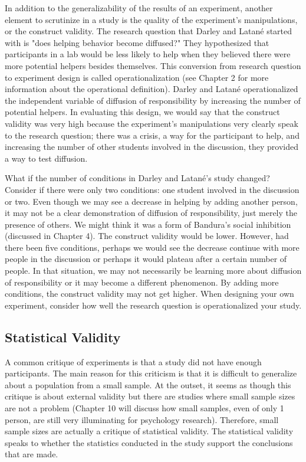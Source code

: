 In addition to the generalizability of the results of an experiment, another element to scrutinize in a study is the quality of the experiment's manipulations, or the construct validity. The research question that Darley and Latané started with is "does helping behavior become diffused?" They hypothesized that participants in a lab would be less likely to help when they believed there were more potential helpers besides themselves. This conversion from research question to experiment design is called operationalization (see Chapter 2 for more information about the operational definition). Darley and Latané operationalized the independent variable of diffusion of responsibility by increasing the number of potential helpers. In evaluating this design, we would say that the construct validity was very high because the experiment's manipulations very clearly speak to the research question; there was a crisis, a way for the participant to help, and increasing the number of other students involved in the discussion, they provided a way to test diffusion.
 

 

What if the number of conditions in Darley and Latané's study changed? Consider if there were only two conditions: one student involved in the discussion or two. Even though we may see a decrease in helping by adding another person, it may not be a clear demonstration of diffusion of responsibility, just merely the presence of others. We might think it was a form of Bandura's social inhibition (discussed in Chapter 4). The construct validity would
be lower. However, had there been five conditions, perhaps we would see the decrease continue with more people in the discussion or perhaps it would plateau after a certain number of people. In that situation, we may not necessarily be learning more about diffusion of responsibility or it may become a different phenomenon. By adding more conditions, the construct validity may not get higher. When designing your own experiment, consider how well the research question is operationalized your study.
 

 

\subsection{Statistical Validity}
 

 

A common critique of experiments is that a study did not have enough participants. The main reason for this criticism is that it is difficult to generalize about a population from a small sample. At the outset, it seems as though this critique is about external validity but there are studies where small sample sizes are not a problem (Chapter 10 will discuss how small samples, even of only 1 person, are still very illuminating for psychology research). Therefore, small sample sizes are actually a critique of statistical validity. The statistical validity speaks to whether the statistics conducted in the study support the conclusions that are made.
 

